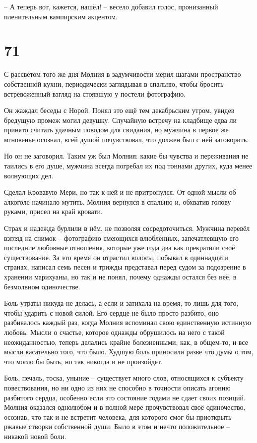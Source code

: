 \documentclass[
  a5paperpaper,
  DIV=11,
  numbers=noendperiod]{scrreprt}
\begin{document}
-- А теперь вот, кажется, нашёл! -- весело добавил голос, пронизанный
пленительным вампирским акцентом.

\section*{71}\label{71}


С рассветом того же дня Молния в задумчивости мерил шагами пространство
собственной кухни, периодически заглядывая в спальню, чтобы бросить
встревоженный взгляд на стоявшую у постели фотографию.

Он жаждал беседы с Норой. Понял это ещё тем декабрьским утром, увидев
бредущую промеж могил девушку. Случайную встречу на кладбище едва ли
принято считать удачным поводом для свидания, но мужчина в первое же
мгновенье осознал, всей душой почувствовал, что должен был с ней
заговорить.

Но он не заговорил. Таким уж был Молния: какие бы чувства и переживания
не таились в его душе, мужчина всегда погребал их под тоннами других,
куда менее волнующих дел.

Сделал Кровавую Мери, но так к ней и не притронулся. От одной мысли об
алкоголе начинало мутить. Молния вернулся в спальню и, обхватив голову
руками, присел на край кровати.

Страх и надежда бурлили в нём, не позволяя сосредоточиться. Мужчина
перевёл взгляд на снимок -- фотографию смеющихся влюбленных,
запечатлевшую его последние любовные отношения, которые уже года два как
прекратили своё существование. За это время он отрастил волосы, побывал
в одиннадцати странах, написал семь песен и трижды представал перед
судом за подозрение в хранении марихуаны, но так и не понял, почему
однажды остался без неё, в безмолвном одиночестве.

Боль утраты никуда не делась, а если и затихала на время, то лишь для
того, чтобы ударить с новой силой. Его сердце не было просто разбито,
оно разбивалось каждый раз, когда Молния вспоминал свою единственную
истинную любовь. Мысли о счастье, которое однажды обрушилось на него с
такой неожиданностью, теперь делались крайне болезненными, как, в
общем-то, и все мысли касательно того, что было. Худшую боль приносили
разве что думы о том, что могло бы быть, но так никогда и не произойдет.

Боль, печаль, тоска, уныние -- существует много слов, относящихся к
субъекту повествования, но ни одно из них не способно в точности описать
агонию разбитого сердца, особенно если это состояние годами не сдает
своих позиций. Молния оказался однолюбом и в полной мере прочувствовал
своё одиночество, осознав, что так и не встретит человека, для которого
смог бы приоткрыть ржавые створки собственной души. Было в этом и нечто
положительное -- никакой новой боли.
\end{document}
